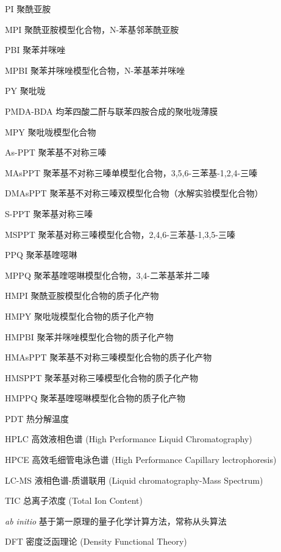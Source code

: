 
\begin{denotation}[3cm]
  \item[PI] 聚酰亚胺
  \item[MPI] 聚酰亚胺模型化合物，N-苯基邻苯酰亚胺
  \item[PBI] 聚苯并咪唑
  \item[MPBI] 聚苯并咪唑模型化合物，N-苯基苯并咪唑
  \item[PY] 聚吡咙
  \item[PMDA-BDA] 均苯四酸二酐与联苯四胺合成的聚吡咙薄膜
  \item[MPY] 聚吡咙模型化合物
  \item[As-PPT] 聚苯基不对称三嗪
  \item[MAsPPT] 聚苯基不对称三嗪单模型化合物，3,5,6-三苯基-1,2,4-三嗪
  \item[DMAsPPT] 聚苯基不对称三嗪双模型化合物（水解实验模型化合物）
  \item[S-PPT] 聚苯基对称三嗪
  \item[MSPPT] 聚苯基对称三嗪模型化合物，2,4,6-三苯基-1,3,5-三嗪
  \item[PPQ] 聚苯基喹噁啉
  \item[MPPQ] 聚苯基喹噁啉模型化合物，3,4-二苯基苯并二嗪
  \item[HMPI] 聚酰亚胺模型化合物的质子化产物
  \item[HMPY] 聚吡咙模型化合物的质子化产物
  \item[HMPBI] 聚苯并咪唑模型化合物的质子化产物
  \item[HMAsPPT] 聚苯基不对称三嗪模型化合物的质子化产物
  \item[HMSPPT] 聚苯基对称三嗪模型化合物的质子化产物
  \item[HMPPQ] 聚苯基喹噁啉模型化合物的质子化产物
  \item[PDT] 热分解温度
  \item[HPLC] 高效液相色谱 (High Performance Liquid Chromatography)
  \item[HPCE] 高效毛细管电泳色谱 (High Performance Capillary lectrophoresis)
  \item[LC-MS] 液相色谱-质谱联用 (Liquid chromatography-Mass Spectrum)
  \item[TIC] 总离子浓度 (Total Ion Content)
  \item[\textit{ab initio}] 基于第一原理的量子化学计算方法，常称从头算法
  \item[DFT] 密度泛函理论 (Density Functional Theory)

\end{denotation}
